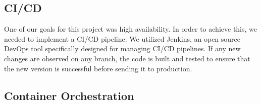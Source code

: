 \subsection{CI/CD}
One of our goals for this project was high availability. In order to achieve this, we needed to implement a CI/CD pipeline. We utilized Jenkins, an open source DevOps tool specifically designed for managing CI/CD pipelines. If any new changes are observed on any branch, the code is built and tested to ensure that the new version is successful before sending it to production.

\subsection{Container Orchestration}
